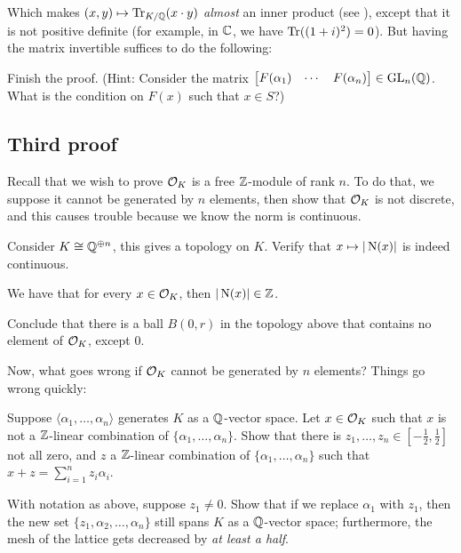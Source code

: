 Which makes $(x, y) \mapsto \operatorname{Tr}_{K/\mathbb Q}(x \cdot y)$ \emph{almost} an inner product
(see ),
except that it is not positive definite (for example, in $\mathbb C$, we have $\operatorname{Tr}((1+i)^2) = 0$).
But having the matrix invertible suffices to do the following:

\begin{exercise}
	Finish the proof. (Hint: Consider the matrix
	$\begin{bmatrix} F(\alpha_1) & \cdots & F(\alpha_n) \end{bmatrix} \in \operatorname{GL}_n(\mathbb Q)$.
	What is the condition on $F(x)$ such that $x \in S$?)
\end{exercise}

\subsection{Third proof}

Recall that we wish to prove $\mathcal O_K$ is a free $\mathbb Z$-module of rank $n$.
To do that, we suppose it cannot be generated by $n$ elements, then show that $\mathcal O_K$ is not
discrete, and this causes trouble because we know the norm is continuous.
\begin{exercise}
	Consider $K \cong \mathbb Q^{\oplus n}$, this gives a topology on $K$.
	Verify that $x \mapsto |\operatorname{N}(x)|$ is indeed continuous.
\end{exercise}
We have that for every $x \in \mathcal O_K$, then $|\operatorname{N}(x)| \in \mathbb Z$.
\begin{exercise}
	Conclude that there is a ball $B(0, r)$ in the topology above that contains no element of
	$\mathcal O_K$, except $0$.
\end{exercise}

Now, what goes wrong if $\mathcal O_K$ cannot be generated by $n$ elements? Things go wrong quickly:
\begin{exercise}
	Suppose $\langle \alpha_1, \dots, \alpha_n \rangle$ generates $K$ as a $\mathbb Q$-vector space.
	Let $x \in \mathcal O_K$ such that $x$ is not a $\mathbb Z$-linear combination of $\{ \alpha_1, \dots,
	\alpha_n \}$.
	Show that there is $z_1, \dots, z_n \in [-\frac{1}{2}, \frac{1}{2}]$ not all zero,
	and $z$ a $\mathbb Z$-linear combination of $\{ \alpha_1, \dots, \alpha_n \}$
	such that $x + z = \sum_{i=1}^n z_i \alpha_i$.
\end{exercise}
\begin{exercise}
	With notation as above, suppose $z_1 \neq 0$. Show that if we replace $\alpha_1$ with $z_1$,
	then the new set $\{ z_1, \alpha_2, \dots, \alpha_n \}$ still spans $K$ as a $\mathbb Q$-vector space;
	furthermore, the mesh of the lattice gets decreased by \emph{at least a half}.
\end{exercise}

